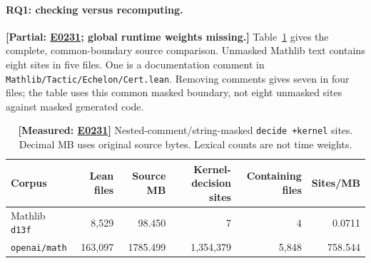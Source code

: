 \documentclass[10pt,twocolumn]{article}
\newcommand{\measured}[1]{\textbf{[Measured: #1]}}
\newcommand{\partialev}[1]{\textbf{[Partial: #1]}}
\newcommand{\expref}[2]{\href{https://github.com/yunwei37/proofserve/blob/main/docs/tmp/build-and-evaluate/step-#1/step-report.md}{E#2}}
\begin{document}
\paragraph{RQ1: checking versus recomputing.}
\partialev{\expref{0231-20261101T001556+0000}{0231}; global runtime weights missing.}
Table~\ref{tab:corpora} gives the complete, common-boundary source comparison.
Unmasked Mathlib text contains eight sites in five files.
One is a documentation comment in \texttt{Mathlib/Tactic/Echelon/Cert.lean}.
Removing comments gives seven in four files; the table uses this common
masked boundary, not eight unmasked sites against masked generated code.
\begin{table}[t]
\centering\small
\begin{tabular}{lrrrrr}
\toprule
Corpus & Lean files & Source MB & Kernel-decision sites & Containing files & Sites/MB\\
\midrule
Mathlib \texttt{d13f} &8,529&98.450&7&4&0.0711\\
\texttt{openai/math} &163,097&1785.499&1,354,379&5,848&758.544\\
\bottomrule
\end{tabular}
\caption{\measured{\expref{0231-20261101T001556+0000}{0231}} Nested-comment/string-masked \texttt{decide +kernel} sites.
Decimal MB uses original source bytes. Lexical counts are not time weights.}
\label{tab:corpora}
\end{table}
\end{document}
